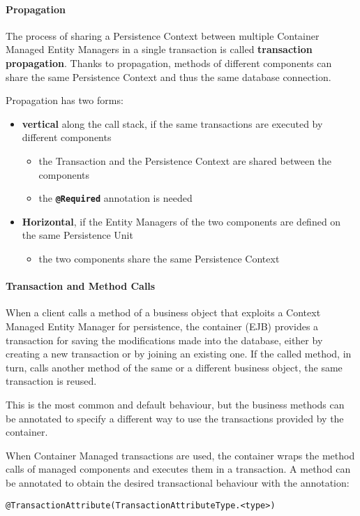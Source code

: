 \documentclass[english]{article}
\begin{document}
\paragraph{Propagation}

The process of sharing a Persistence Context between multiple Container Managed Entity Managers in a single \jta transaction is called \textbf{transaction propagation}.
Thanks to propagation, methods of different components can share the same Persistence Context and thus the same database connection.

Propagation has two forms:

\begin{itemize}
  \item \textbf{vertical} along the call stack, if the same transactions are executed by different components
        \begin{itemize}
          \item the Transaction and the Persistence Context are shared between the components
          \item the \textbf{\texttt{@Required}} annotation is needed
        \end{itemize}
  \item \textbf{Horizontal}, if the Entity Managers of the two components are defined on the same Persistence Unit
        \begin{itemize}
          \item the two components share the same Persistence Context
        \end{itemize}
\end{itemize}

\paragraph{Transaction and Method Calls}

When a client calls a method of a business object that exploits a Context Managed Entity Manager for persistence, the container (EJB) provides a transaction for saving the modifications made into the database, either by creating a new transaction or by joining an existing one.
If the called method, in turn, calls another method of the same or a different business object, the same transaction is reused.

This is the most common and default behaviour, but the business methods can be annotated to specify a different way to use the transactions provided by the container.

\bigskip
When Container Managed transactions are used, the container wraps the method calls of managed components and executes them in a transaction.
A method can be annotated to obtain the desired transactional behaviour with the annotation:
\begin{center}
  \texttt{@TransactionAttribute(TransactionAttributeType.<type>)}
\end{center}
\end{document}
